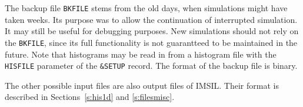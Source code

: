 The backup file \texttt{BKFILE} stems from the old days, when simulations might
have taken weeks. Its purpose was to allow the continuation of interrupted
simulation. It may still be useful for debugging purposes. New simulations
should not rely on the \texttt{BKFILE}, since its full functionality is not
guarantteed to be maintained in the future. Note that histograms may be read in
from a histogram file with the \texttt{HISFILE} parameter of the \texttt{\&SETUP}
record. The format of the backup file is binary.

The other possible input files are also output files of IMSIL. Their format is
described in Sections~\ref{s:his1d} and \ref{s:filesmisc}.

